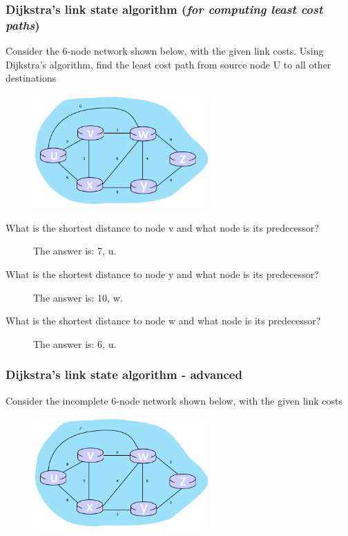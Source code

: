     \subsubsection*{Dijkstra's link state algorithm (\textit{for computing least cost paths})}
    \noindent Consider the 6-node network shown below, with the given link costs. Using Dijkstra's algorithm, find the least cost path from source node U to all other
    destinations
    \begin{figure}[H]
        \centering
        \includegraphics[width=0.6\textwidth]{img/descarga.png}
    \end{figure}
    \begin{description}
        \item[What is the shortest distance to node v and what node is its predecessor?] The answer is: 7, u.
        \item[What is the shortest distance to node y and what node is its predecessor?] The answer is: 10, w. 
        \item[What is the shortest distance to node w and what node is its predecessor?] The answer is: 6, u. 
    \end{description}

    \newpage
    \subsubsection*{Dijkstra's link state algorithm - advanced}
    \noindent Consider the incomplete 6-node network shown below, with the given link costs
    \begin{figure}[H]
        \centering
        \includegraphics[width=0.6\textwidth]{img/descarga (1).png}
    \end{figure}

